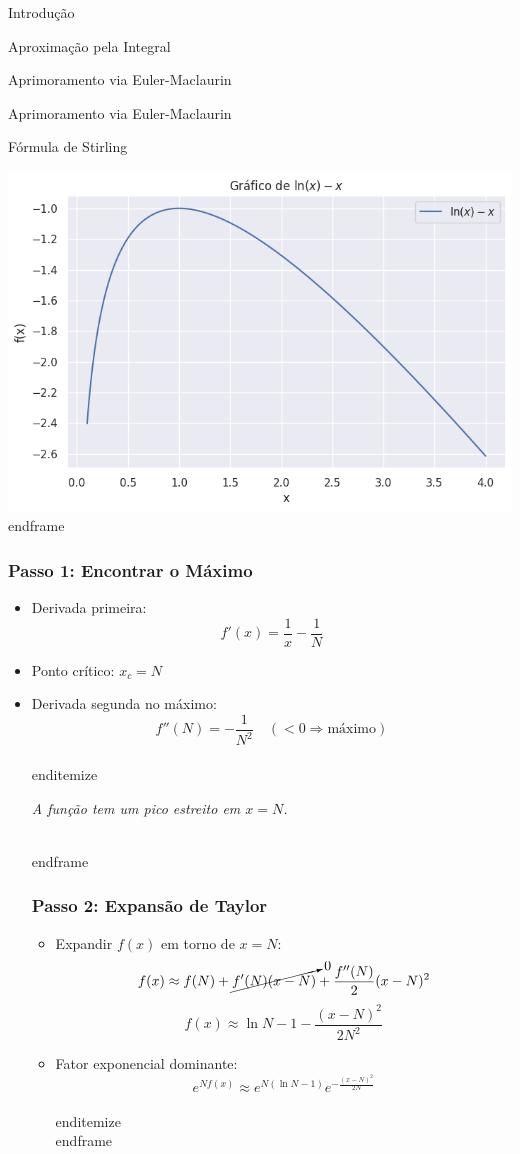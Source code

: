 \documentclass[11pt]{beamer}
\begin{document}
\begin{frame}
\begin{frame}
\begin{itemize}
\begin{frame}{Introdução}
\begin{itemize}
\begin{frame}{Aproximação pela Integral}
\begin{itemize}
\begin{frame}{Aprimoramento via Euler-Maclaurin}
\begin{itemize}
\begin{frame}{Aprimoramento via Euler-Maclaurin}
\begin{itemize}
\begin{frame}{Fórmula de Stirling}
\begin{itemize}
\begin{frame}
\begin{itemize}
\begin{frame}
\begin{itemize}
\begin{frame}
  \includegraphics[scale=0.5]{laplace.png}
\\end{frame}

\begin{frame}
\frametitle{Passo 1: Encontrar o Máximo}
\begin{itemize}
\item Derivada primeira:
\[ f'(x) = \frac{1}{x} - \frac{1}{N} \]
\item Ponto crítico: \( x_c = N \)
\item Derivada segunda no máximo:
\[ f''(N) = -\frac{1}{N^2} \quad (< 0 \Rightarrow \text{máximo}) \]
\\end{itemize}
\begin{center}
    \textit{A função tem um pico estreito em \( x = N \).}
\end{center}
\\end{frame}

\begin{frame}
\frametitle{Passo 2: Expansão de Taylor}
\begin{itemize}
\item Expandir \( f(x) \) em torno de \( x = N \):
\[
f(x) \approx f(N) + \cancelto{0}{f'(N)(x-N)} + \frac{f''(N)}{2}(x-N)^2
\]
\[
f(x) \approx \ln N - 1 - \frac{(x-N)^2}{2N^2}
\]
\item Fator exponencial dominante:
\[
e^{N f(x)} \approx e^{N (\ln N - 1)} e^{-\frac{(x-N)^2}{2N}}
\]
\\end{itemize}
\\end{frame}


\end{itemize}
\end{frame}
\end{itemize}
\end{frame}
\end{frame}
\end{itemize}
\end{frame}
\end{itemize}
\end{frame}
\end{itemize}
\end{frame}
\end{itemize}
\end{frame}
\end{itemize}
\end{frame}
\end{itemize}
\end{frame}
\end{itemize}
\end{frame}
\end{itemize}
\end{frame}
\end{frame}
\end{document}

